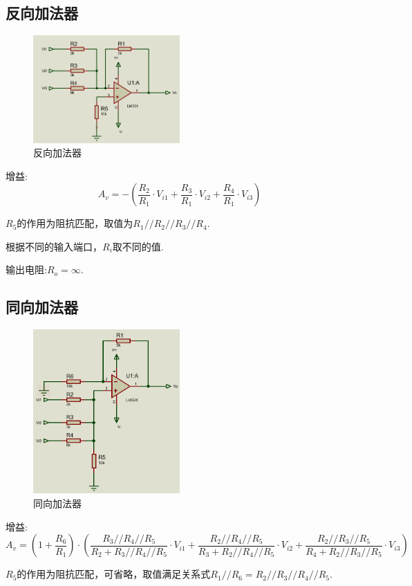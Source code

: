 \documentclass[a4paper,11pt,UTF8]{article}
\begin{document}
\subsection{反向加法器}
\begin{figure}[H]
	\centering
	\includegraphics[width=0.5\textwidth]{反向加法器}
	\caption{反向加法器}
\end{figure}
增益:
$$A_v=-(\frac{R_2}{R_1}\cdot V_{i1}+\frac{R_3}{R_1}\cdot V_{i2}+\frac{R_4}{R_1}\cdot V_{i3})$$

$R_5$的作用为阻抗匹配，取值为$R_1//R_2//R_3//R_4$.

根据不同的输入端口，$R_i$取不同的值.

输出电阻:$R_o = \infty$.
\subsection{同向加法器}
\begin{figure}[H]
	\centering
	\includegraphics[width=0.5\textwidth]{同向加法器}
	\caption{同向加法器}
\end{figure}
增益:
$$A_v=(1+\frac{R_6}{R_1})\cdot(\frac{R_3//R_4//R_5}{R_2+R_3//R_4//R_5}\cdot V_{i1}+\frac{R_2//R_4//R_5}{R_3+R_2//R_4//R_5}\cdot V_{i2}+\frac{R_2//R_3//R_5}{R_4+R_2//R_3//R_5}\cdot V_{i3})$$

$R_5$的作用为阻抗匹配，可省略，取值满足关系式$R_1//R_6=R_2//R_3//R_4//R_5$.
\end{document}
